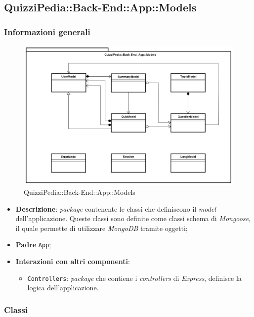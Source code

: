 \subsection{QuizziPedia::Back-End::App::Models}
\subsubsection{Informazioni generali}
\label{QuizziPedia::Back-End::App::Models}
\begin{figure}[ht]
	\centering
	\includegraphics[scale=0.5]{UML/Package/QuizziPedia_Back-End_App_Models.png}
	\caption{QuizziPedia::Back-End::App::Models}
\end{figure}
\FloatBarrier
\begin{itemize}
	\item \textbf{Descrizione}: \textit{package} contenente le classi che definiscono il \textit{model} dell'applicazione. Queste classi sono definite come classi schema di \textit{Mongoose}, il quale permette di utilizzare \textit{MongoDB} tramite oggetti;
	\item \textbf{Padre} \texttt{App};
	\item \textbf{Interazioni con altri componenti}:
	\begin{itemize}
		\item \texttt{Controllers}:
		\textit{package} che contiene i \textit{controllers}  di \textit{Express}, definisce la logica dell'applicazione.
	\end{itemize}
\end{itemize}

\subsubsection{Classi}







